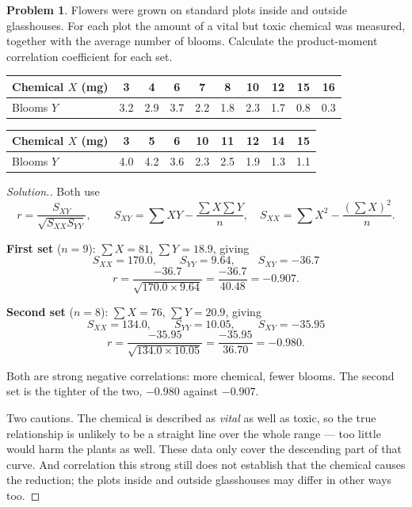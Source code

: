 \documentclass[11pt,a4paper]{article}
\theoremstyle{definition}
\newtheorem{problemx}{Problem}[section]
\newenvironment{problem}{\begin{problemx}}{\end{problemx}}
\newenvironment{solution}
  {\renewcommand{\qedsymbol}{}\begin{proof}[\textit{Solution}.]}
  {\end{proof}}
\begin{document}
\begin{problem}
Flowers were grown on standard plots inside and outside glasshouses. For each plot the amount
of a vital but toxic chemical was measured, together with the average number of blooms.
Calculate the product-moment correlation coefficient for each set.
\begin{table}[H]
\centering
\begin{tabular}{|l|c|c|c|c|c|c|c|c|c|}
\hline
Chemical $X$ (mg) & 3 & 4 & 6 & 7 & 8 & 10 & 12 & 15 & 16\\
\hline
Blooms $Y$ & 3.2 & 2.9 & 3.7 & 2.2 & 1.8 & 2.3 & 1.7 & 0.8 & 0.3\\
\hline
\end{tabular}
\end{table}
\begin{table}[H]
\centering
\begin{tabular}{|l|c|c|c|c|c|c|c|c|}
\hline
Chemical $X$ (mg) & 3 & 5 & 6 & 10 & 11 & 12 & 14 & 15\\
\hline
Blooms $Y$ & 4.0 & 4.2 & 3.6 & 2.3 & 2.5 & 1.9 & 1.3 & 1.1\\
\hline
\end{tabular}
\end{table}
\end{problem}

\begin{solution}
Both use
\[r=\frac{S_{XY}}{\sqrt{S_{XX}S_{YY}}},\qquad
S_{XY}=\sum XY-\frac{\sum X\sum Y}{n},\quad
S_{XX}=\sum X^2-\frac{(\sum X)^2}{n}.\]

\textbf{First set} ($n=9$): $\sum X=81$, $\sum Y=18.9$, giving
\[S_{XX}=170.0,\qquad S_{YY}=9.64,\qquad S_{XY}=-36.7\]
\[r=\frac{-36.7}{\sqrt{170.0\times 9.64}}=\frac{-36.7}{40.48}=-0.907.\]

\textbf{Second set} ($n=8$): $\sum X=76$, $\sum Y=20.9$, giving
\[S_{XX}=134.0,\qquad S_{YY}=10.05,\qquad S_{XY}=-35.95\]
\[r=\frac{-35.95}{\sqrt{134.0\times 10.05}}=\frac{-35.95}{36.70}=-0.980.\]

Both are strong negative correlations: more chemical, fewer blooms. The second set is the
tighter of the two, $-0.980$ against $-0.907$.

Two cautions. The chemical is described as \emph{vital} as well as toxic, so the true
relationship is unlikely to be a straight line over the whole range --- too little would harm
the plants as well. These data only cover the descending part of that curve. And correlation
this strong still does not establish that the chemical causes the reduction; the plots inside
and outside glasshouses may differ in other ways too.
\end{solution}
\end{document}
